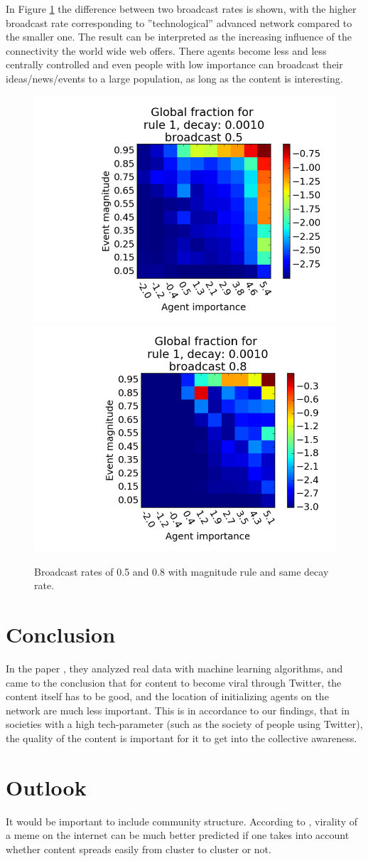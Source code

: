 \documentclass [12pt,a4paper,twoside]{article}
\begin{document}
In Figure \ref{tech} the difference between two broadcast rates is shown, with the higher broadcast rate corresponding to ''technological'' advanced network compared to the smaller one. The result can be interpreted as the increasing influence of the connectivity the world wide web offers. There agents become less and less centrally controlled and even people with low importance can broadcast their ideas/news/events to a large population, as long as the content is interesting.  
\begin{figure}[H]
  \centering
  \includegraphics[width=0.45\linewidth]{report/broad_05.png}
  \includegraphics[width=0.45\linewidth]{report/broad_08.png}  
  \caption{Broadcast rates of 0.5 and 0.8 with magnitude rule and same decay rate.}
  \label{tech}
\end{figure}
\section{Conclusion}
In the paper \cite{Similar-results}, they analyzed real data with machine learning algorithms, and came to the conclusion that for content to become viral through Twitter, the content itself has to be good, and the location of initializing agents on the network are much less important. This is in accordance to our findings, that in societies with a high tech-parameter (such as the society of people using Twitter), the quality of the content is important for it to get into the collective awareness.

\section{Outlook}
It would be important to include community structure. According to \cite{Virality-community-important}, virality of a meme on the internet can be much better predicted if one takes into account whether content spreads easily from cluster to cluster or not.

\small \setlength{\bibsep}{1pt}

%

\end{document}
